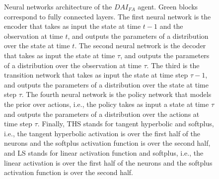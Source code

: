 \documentclass[twoside,11pt]{article}
\begin{document}
\begin{figure}[H]
\begin{center}
	\end{center}
	\caption{Neural networks architecture of the $DAI_{FA}$ agent. Green blocks correspond to fully connected layers. The first neural network is the encoder that takes as input the state at time $t-1$ and the observation at time $t$, and outputs the parameters of a distribution over the state at time $t$. The second neural network is the decoder that takes as input the state at time $\tau$, and outputs the parameters of a distribution over the observation at time $\tau$. The third is the transition network that takes as input the state at time step $\tau - 1$, and outputs the parameters of a distribution over the state at time step $\tau$. The fourth neural network is the policy network that models the prior over actions, i.e., the policy takes as input a state at time $\tau$ and outputs the parameters of a distribution over the actions at time step $\tau$. Finally, THS stands for tangent hyperbolic and softplus, i.e., the tangent hyperbolic activation is over the first half of the neurons and the softplus activation function is over the second half, and LS stands for linear activation function and softplus, i.e., the linear activation is over the first half of the neurons and the softplus activation function is over the second half.}
	\label{fig:kai_dnn}
\end{figure}
\end{document}
